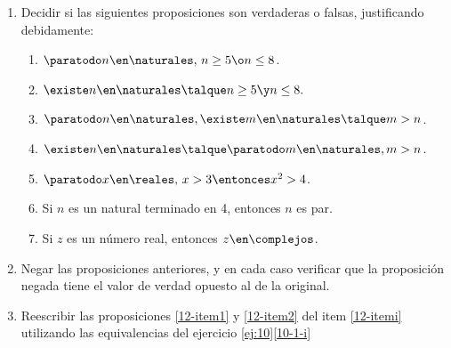 \begin{enunciado}{\ejercicio}
  \begin{enumerate}[label=\roman*)]
    \item\label{12-itemi}
          Decidir si las siguientes proposiciones son verdaderas o falsas, justificando debidamente:
          \begin{multicols}{2}
            \begin{enumerate}[label=\alph*)]
              \item $\paratodo n \en \naturales,\, n \geq 5 \o n \leq 8$.
              \item $\existe n \en \naturales \talque n \geq 5 \y n\leq 8.$
              \item $\paratodo n \en \naturales, \existe m \en \naturales \talque m > n$.
              \item $\existe n \en \naturales \talque \paratodo m \en \naturales, m >n$.
              \item\label{12-item1} $\paratodo x \en \reales,\, x > 3 \entonces x^2 > 4$.
              \item\label{12-item2} Si $n$ es un natural terminado en 4, entonces $n$ es par.
              \item Si $z$ es un número real, entonces $z \en \complejos$.
            \end{enumerate}
          \end{multicols}

    \item Negar las proposiciones anteriores, y en cada caso verificar que la proposición negada tiene el valor de verdad
          opuesto al de la original.

    \item Reescribir las proposiciones \ref{12-item1} y \ref{12-item2} del item \ref{12-itemi}
          utilizando las equivalencias del ejercicio \ref{ej:10}\ref{10-1-i}
  \end{enumerate}
\end{enunciado}

